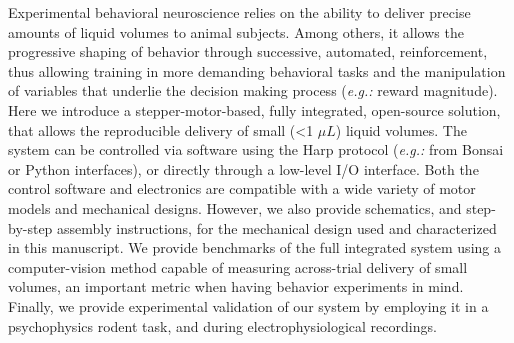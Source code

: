 Experimental behavioral neuroscience relies on the ability to deliver precise amounts of liquid volumes to animal subjects. Among others, it allows the progressive shaping of behavior through successive, automated, reinforcement, thus allowing training in more demanding behavioral tasks and the manipulation of variables that underlie the decision making process (\textit{e.g.:} reward magnitude).
Here we introduce a stepper-motor-based, fully integrated, open-source solution, that allows the reproducible delivery of small (<1 $\mu L$) liquid volumes.
The system can be controlled via software using the Harp protocol (\textit{e.g.:} from Bonsai or Python interfaces), or directly through a low-level I/O interface. Both the control software and electronics are compatible with a wide variety of motor models and mechanical designs. However, we also provide schematics, and step-by-step assembly instructions, for the mechanical design used and characterized in this manuscript.
We provide benchmarks of the full integrated system using a computer-vision method capable of measuring across-trial delivery of small volumes, an important metric when having behavior experiments in mind. Finally, we provide experimental validation of our system by employing it in a psychophysics rodent task, and during electrophysiological recordings.
